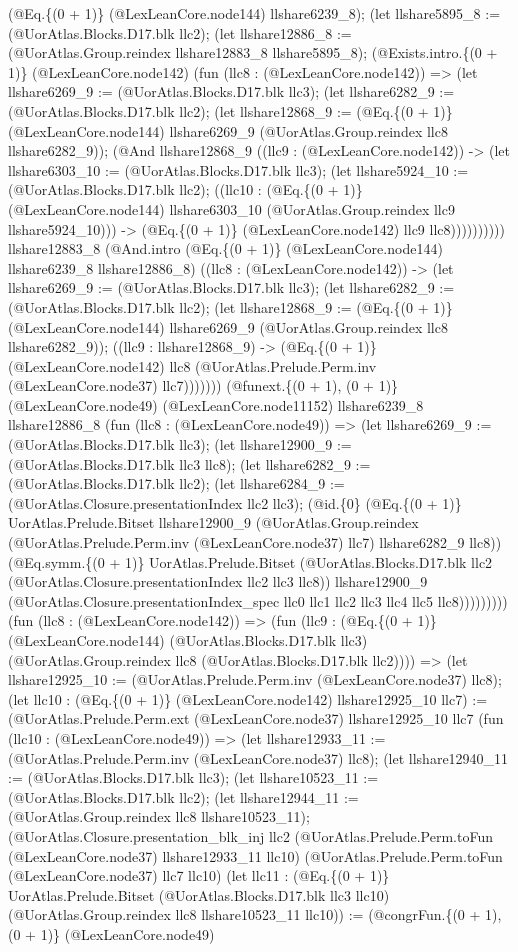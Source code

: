 \documentclass[11pt]{article}
\begin{document}
(@Eq.\{(0 + 1)\} (@LexLeanCore.node144) llshare6239\_8); (let llshare5895\_8 := (@UorAtlas.Blocks.D17.blk llc2); (let llshare12886\_8 := (@UorAtlas.Group.reindex llshare12883\_8 llshare5895\_8); (@Exists.intro.\{(0 + 1)\} (@LexLeanCore.node142) (fun (llc8 : (@LexLeanCore.node142)) => (let llshare6269\_9 := (@UorAtlas.Blocks.D17.blk llc3); (let llshare6282\_9 := (@UorAtlas.Blocks.D17.blk llc2); (let llshare12868\_9 := (@Eq.\{(0 + 1)\} (@LexLeanCore.node144) llshare6269\_9 (@UorAtlas.Group.reindex llc8 llshare6282\_9)); (@And llshare12868\_9 ((llc9 : (@LexLeanCore.node142)) -> (let llshare6303\_10 := (@UorAtlas.Blocks.D17.blk llc3); (let llshare5924\_10 := (@UorAtlas.Blocks.D17.blk llc2); ((llc10 : (@Eq.\{(0 + 1)\} (@LexLeanCore.node144) llshare6303\_10 (@UorAtlas.Group.reindex llc9 llshare5924\_10))) -> (@Eq.\{(0 + 1)\} (@LexLeanCore.node142) llc9 llc8)))))))))) llshare12883\_8 (@And.intro (@Eq.\{(0 + 1)\} (@LexLeanCore.node144) llshare6239\_8 llshare12886\_8) ((llc8 : (@LexLeanCore.node142)) -> (let llshare6269\_9 := (@UorAtlas.Blocks.D17.blk llc3); (let llshare6282\_9 := (@UorAtlas.Blocks.D17.blk llc2); (let llshare12868\_9 := (@Eq.\{(0 + 1)\} (@LexLeanCore.node144) llshare6269\_9 (@UorAtlas.Group.reindex llc8 llshare6282\_9)); ((llc9 : llshare12868\_9) -> (@Eq.\{(0 + 1)\} (@LexLeanCore.node142) llc8 (@UorAtlas.Prelude.Perm.inv (@LexLeanCore.node37) llc7))))))) (@funext.\{(0 + 1), (0 + 1)\} (@LexLeanCore.node49) (@LexLeanCore.node11152) llshare6239\_8 llshare12886\_8 (fun (llc8 : (@LexLeanCore.node49)) => (let llshare6269\_9 := (@UorAtlas.Blocks.D17.blk llc3); (let llshare12900\_9 := (@UorAtlas.Blocks.D17.blk llc3 llc8); (let llshare6282\_9 := (@UorAtlas.Blocks.D17.blk llc2); (let llshare6284\_9 := (@UorAtlas.Closure.presentationIndex llc2 llc3); (@id.\{0\} (@Eq.\{(0 + 1)\} UorAtlas.Prelude.Bitset llshare12900\_9 (@UorAtlas.Group.reindex (@UorAtlas.Prelude.Perm.inv (@LexLeanCore.node37) llc7) llshare6282\_9 llc8)) (@Eq.symm.\{(0 + 1)\} UorAtlas.Prelude.Bitset (@UorAtlas.Blocks.D17.blk llc2 (@UorAtlas.Closure.presentationIndex llc2 llc3 llc8)) llshare12900\_9 (@UorAtlas.Closure.presentationIndex\_spec llc0 llc1 llc2 llc3 llc4 llc5 llc8))))))))) (fun (llc8 : (@LexLeanCore.node142)) => (fun (llc9 : (@Eq.\{(0 + 1)\} (@LexLeanCore.node144) (@UorAtlas.Blocks.D17.blk llc3) (@UorAtlas.Group.reindex llc8 (@UorAtlas.Blocks.D17.blk llc2)))) => (let llshare12925\_10 := (@UorAtlas.Prelude.Perm.inv (@LexLeanCore.node37) llc8); (let llc10 : (@Eq.\{(0 + 1)\} (@LexLeanCore.node142) llshare12925\_10 llc7) := (@UorAtlas.Prelude.Perm.ext (@LexLeanCore.node37) llshare12925\_10 llc7 (fun (llc10 : (@LexLeanCore.node49)) => (let llshare12933\_11 := (@UorAtlas.Prelude.Perm.inv (@LexLeanCore.node37) llc8); (let llshare12940\_11 := (@UorAtlas.Blocks.D17.blk llc3); (let llshare10523\_11 := (@UorAtlas.Blocks.D17.blk llc2); (let llshare12944\_11 := (@UorAtlas.Group.reindex llc8 llshare10523\_11); (@UorAtlas.Closure.presentation\_blk\_inj llc2 (@UorAtlas.Prelude.Perm.toFun (@LexLeanCore.node37) llshare12933\_11 llc10) (@UorAtlas.Prelude.Perm.toFun (@LexLeanCore.node37) llc7 llc10) (let llc11 : (@Eq.\{(0 + 1)\} UorAtlas.Prelude.Bitset (@UorAtlas.Blocks.D17.blk llc3 llc10) (@UorAtlas.Group.reindex llc8 llshare10523\_11 llc10)) := (@congrFun.\{(0 + 1), (0 + 1)\} (@LexLeanCore.node49) 
\end{document}
